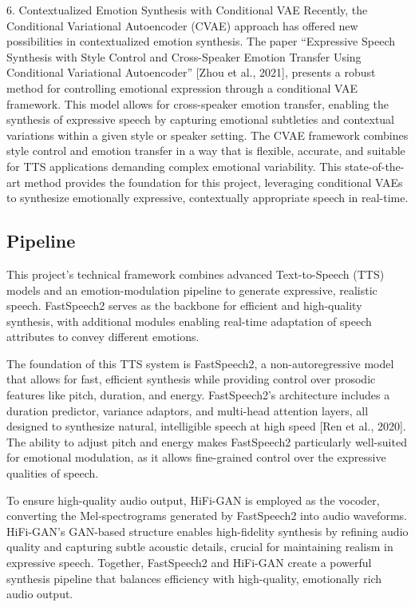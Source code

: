 6. Contextualized Emotion Synthesis with Conditional VAE
Recently, the Conditional Variational Autoencoder (CVAE) approach has offered new possibilities in contextualized emotion synthesis. The paper “Expressive Speech Synthesis with Style Control and Cross-Speaker Emotion Transfer Using Conditional Variational Autoencoder” [Zhou et al., 2021], presents a robust method for controlling emotional expression through a conditional VAE framework. This model allows for cross-speaker emotion transfer, enabling the synthesis of expressive speech by capturing emotional subtleties and contextual variations within a given style or speaker setting. The CVAE framework combines style control and emotion transfer in a way that is flexible, accurate, and suitable for TTS applications demanding complex emotional variability. This state-of-the-art method provides the foundation for this project, leveraging conditional VAEs to synthesize emotionally expressive, contextually appropriate speech in real-time.

\subsection{Pipeline}

This project’s technical framework combines advanced Text-to-Speech (TTS) models and an emotion-modulation pipeline to generate expressive, realistic speech. FastSpeech2 serves as the backbone for efficient and high-quality synthesis, with additional modules enabling real-time adaptation of speech attributes to convey different emotions.


The foundation of this TTS system is FastSpeech2, a non-autoregressive model that allows for fast, efficient synthesis while providing control over prosodic features like pitch, duration, and energy. FastSpeech2’s architecture includes a duration predictor, variance adaptors, and multi-head attention layers, all designed to synthesize natural, intelligible speech at high speed [Ren et al., 2020]. The ability to adjust pitch and energy makes FastSpeech2 particularly well-suited for emotional modulation, as it allows fine-grained control over the expressive qualities of speech.

To ensure high-quality audio output, HiFi-GAN is employed as the vocoder, converting the Mel-spectrograms generated by FastSpeech2 into audio waveforms. HiFi-GAN’s GAN-based structure enables high-fidelity synthesis by refining audio quality and capturing subtle acoustic details, crucial for maintaining realism in expressive speech. Together, FastSpeech2 and HiFi-GAN create a powerful synthesis pipeline that balances efficiency with high-quality, emotionally rich audio output.

